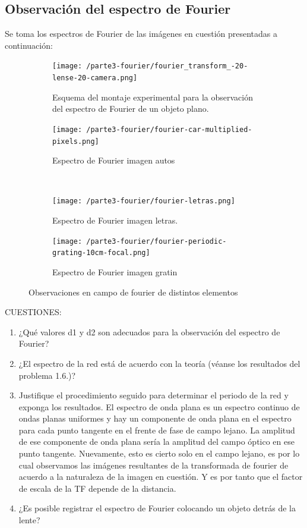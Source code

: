 \documentclass{./packages/optica-article}
\begin{document}
\subsection{Observación del espectro de Fourier}
Se toma los espectros de Fourier de las imágenes en cuestión presentadas a continuación:

\begin{figure}[hptb]
\begin{center}
    \begin{subfigure}[t]{0.45\textwidth}\centering
        \texttt{[image: /parte3-fourier/fourier\_transform\_-20-lense-20-camera.png]}
    \caption{Esquema del montaje experimental para la observación del espectro de Fourier de un objeto plano. }
    \label{fig:fourier1}
    \end{subfigure}
	\hfill
	\begin{subfigure}[t]{0.45\textwidth}\centering
		\texttt{[image: /parte3-fourier/fourier-car-multiplied-pixels.png]}
    \caption{Espectro de Fourier imagen autos }
    \label{fig:fourier2}
	\end{subfigure}
	\\
	\begin{subfigure}[t]{0.45\textwidth}\centering
		\texttt{[image: /parte3-fourier/fourier-letras.png]}
    \caption{Espectro de Fourier imagen letras. }
    \label{fourier3}
	\end{subfigure}
	\hfill
	\begin{subfigure}[t]{0.45\textwidth}\centering
		\texttt{[image: /parte3-fourier/fourier-periodic-grating-10cm-focal.png]}
    \caption{Espectro de Fourier imagen gratin }
    \label{fourier4}
	\end{subfigure}
	
	\caption{Observaciones en campo de fourier de distintos elementos
	}
	\label{fig:alltalbot}
\end{center}
\end{figure}

CUESTIONES:
\begin{enumerate}
    \item ¿Qué valores d1 y d2 son adecuados para la observación del espectro de Fourier?
    \item ¿El espectro de la red está de acuerdo con la teoría (véanse los resultados del problema 1.6.)?
    \item Justifique el procedimiento seguido para determinar el periodo de la red y exponga los resultados.
    El espectro de onda plana es un espectro continuo de ondas planas uniformes y hay un componente de onda plana en el espectro para cada punto tangente en el frente de fase de campo lejano. La amplitud de ese componente de onda plana sería la amplitud del campo óptico en ese punto tangente. Nuevamente, esto es cierto solo en el campo lejano, es por lo cual observamos las imágenes resultantes de la transformada de fourier de acuerdo a la naturaleza de la imagen en cuestión. Y es por tanto que el factor de escala de la TF depende de la distancia.
    \item ¿Es posible registrar el espectro de Fourier colocando un objeto detrás de la lente?
\end{enumerate}
\end{document}
